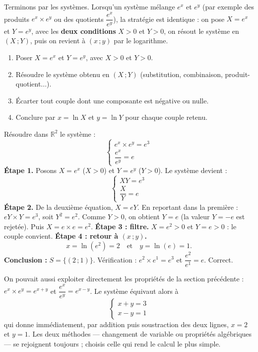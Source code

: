 \documentclass[11pt]{article}
\newcounter{popsec}
\newcounter{popsub}
\newcommand{\courssub}[1]{%
  \stepcounter{popsub}%
  \par\vspace{9pt}\noindent{\popxbold\fontsize{11.5}{13}\selectfont\color{popink}{\color{poporange}\thepopsec.\thepopsub}\hspace{6pt}#1}\par\nopagebreak\vspace{4pt}
}
\begin{document}
\courssub{Systèmes d'équations en $e^x$ et $e^y$}

Terminons par les systèmes. Lorsqu'un système mélange $e^x$ et $e^y$ (par exemple des produits $e^x \times e^y$ ou des quotients $\dfrac{e^x}{e^y}$), la stratégie est identique : on pose $X = e^x$ et $Y = e^y$, avec les \textbf{deux conditions} $X > 0$ et $Y > 0$, on résout le système en $(X\,; Y)$, puis on revient à $(x\,; y)$ par le logarithme.

\begin{methode}
\begin{enumerate}
\item Poser $X = e^x$ et $Y = e^y$, avec $X > 0$ et $Y > 0$.
\item Résoudre le système obtenu en $(X\,; Y)$ (substitution, combinaison, produit-quotient...).
\item Écarter tout couple dont une composante est négative ou nulle.
\item Conclure par $x = \ln X$ et $y = \ln Y$ pour chaque couple retenu.
\end{enumerate}
\end{methode}

\begin{exoresolu}[Résoudre le système $e^x \times e^y = e^3$ et $\dfrac{e^x}{e^y} = e$]
Résoudre dans $\mathbb{R}^2$ le système :
\[ \begin{cases} e^x \times e^y = e^3 \\[2pt] \dfrac{e^x}{e^y} = e \end{cases} \]
\tcblower
\textbf{Étape 1.} Posons $X = e^x$ ($X > 0$) et $Y = e^y$ ($Y > 0$). Le système devient :
\[ \begin{cases} XY = e^3 \\[2pt] \dfrac{X}{Y} = e \end{cases} \]
\textbf{Étape 2.} De la deuxième équation, $X = eY$. En reportant dans la première : $eY \times Y = e^3$, soit $Y^2 = e^2$. Comme $Y > 0$, on obtient $Y = e$ (la valeur $Y = -e$ est rejetée). Puis $X = e \times e = e^2$.
\textbf{Étape 3 : filtre.} $X = e^2 > 0$ et $Y = e > 0$ : le couple convient.
\textbf{Étape 4 : retour à $(x\,; y)$.}
\[ x = \ln(e^2) = 2 \quad \text{et} \quad y = \ln(e) = 1. \]
\textbf{Conclusion :} $S = \{(2\,; 1)\}$. Vérification : $e^2 \times e^1 = e^3$ et $\dfrac{e^2}{e^1} = e$. Correct.
\end{exoresolu}

\begin{exemplebox}
On pouvait aussi exploiter directement les propriétés de la section précédente : $e^x \times e^y = e^{x+y}$ et $\dfrac{e^x}{e^y} = e^{x-y}$. Le système équivaut alors à
\[ \begin{cases} x + y = 3 \\ x - y = 1 \end{cases} \]
qui donne immédiatement, par addition puis soustraction des deux lignes, $x = 2$ et $y = 1$. Les deux méthodes — changement de variable ou propriétés algébriques — se rejoignent toujours ; choisis celle qui rend le calcul le plus simple.
\end{exemplebox}
\end{document}
